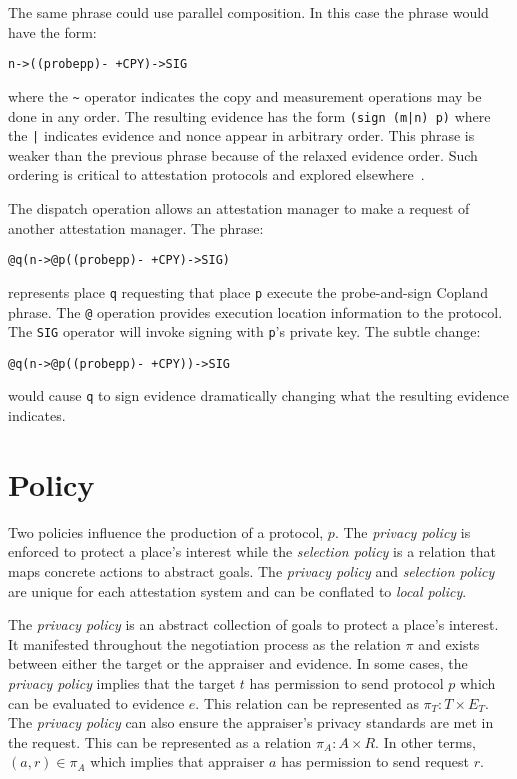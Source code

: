 \documentclass[sigconf,authordraft]{acmart}
\begin{document}
The same phrase could use parallel composition.  In this case the
phrase would have the form:

\begin{alltt}
  n -> ((probe p p) -~+ CPY) -> SIG
\end{alltt}

\noindent where the \verb+~+ operator indicates the copy and
measurement operations may be done in any order.  The resulting
evidence has the form \verb+(sign (m|n) p)+ where the \verb+|+
indicates evidence and nonce appear in arbitrary order.  This phrase
is weaker than the previous phrase because of the relaxed evidence
order.  Such ordering is critical to attestation protocols and
explored elsewhere~\cite{Rowe:2016bi}.

The dispatch operation allows an attestation manager to make a request
of another attestation manager.  The phrase:

\begin{alltt}
  @q(n -> @p((probe p p) -~+ CPY) -> SIG)
\end{alltt}

\noindent represents place \verb+q+ requesting that place \verb+p+
execute the probe-and-sign Copland phrase.  The \verb+@+ operation
provides execution location information to the protocol.  The
\verb+SIG+ operator will invoke signing with \verb+p+'s private
key. The subtle change:

\begin{alltt}
  @q(n -> @p((probe p p) -~+ CPY)) -> SIG
\end{alltt}

\noindent would cause \verb+q+ to sign evidence dramatically changing
what the resulting evidence indicates.

\section{Policy}

Two policies influence the production of a protocol, $p$. The \emph{privacy policy} is enforced to protect a place's interest while the \emph{selection policy} is a relation that maps concrete actions to abstract goals. The \emph{privacy policy} and \emph{selection policy} are unique for each attestation system and can be conflated to \emph{local policy}.

The \emph{privacy policy} is an abstract collection of goals to protect a place's interest. It manifested throughout the negotiation process as the relation $\pi$ and exists between either the target or the appraiser and evidence. In some cases, the \emph{privacy policy} implies that the target $t$ has permission to send protocol $p$ which can be evaluated to evidence $e$. This relation can be represented as $\pi_T : T\times E_T$. The \emph{privacy policy} can also ensure the appraiser's privacy standards are met in the request. This can be represented as a relation  $\pi_A : A\times R$. In other terms, $(a,r)\in\pi_A$ which implies that appraiser $a$ has permission to send request $r$.
\end{document}
